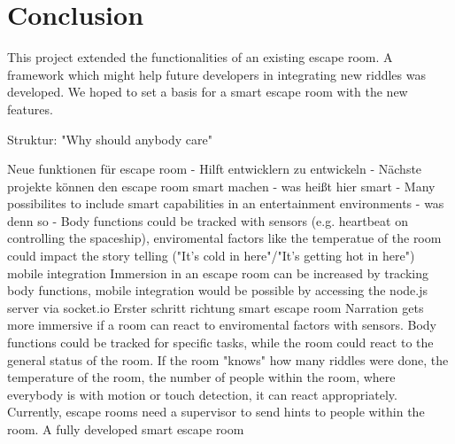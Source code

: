 \section{Conclusion}
This project extended the functionalities of an existing escape room.
A framework which might help future developers in integrating new riddles was developed.
We hoped to set a basis for a smart escape room with the new features.


Struktur:
"Why should anybody care"

Neue funktionen für escape room -
Hilft entwicklern zu entwickeln -
Nächste projekte können den escape room smart machen -
was heißt hier smart - Many possibilites to include smart capabilities in an entertainment environments -
was denn so  - 
Body functions could be tracked with sensors (e.g. heartbeat on controlling the spaceship), 
enviromental factors like the temperatue of the room could impact the story telling ("It's cold in here"/"It's getting hot in here")
mobile integration 
Immersion in an escape room can be increased by tracking body functions,
mobile integration would be possible by accessing the node.js server via socket.io
Erster schritt richtung smart escape room
Narration gets more immersive if a room can react to enviromental factors with sensors. 
Body functions could be tracked for specific tasks, while the room could react to the general status of the room. 
If the room "knows" how many riddles were done, the temperature of the room, 
the number of people within the room, where everybody is with motion or touch detection, it can react appropriately.
Currently, escape rooms need a supervisor to send hints to people within the room. 
A fully developed smart escape room

